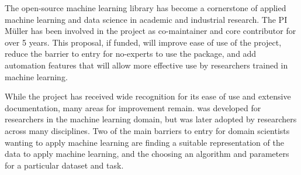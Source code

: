 \vspace{-3mm}
\vspace{-3mm}
The open-source machine learning library \sklearn{} has become a cornerstone of
applied machine learning and data science in academic and industrial research.
The PI M\"uller has been involved in the \sklearn{} project as co-maintainer
and core contributor for over 5 years. This proposal, if funded, will improve
ease of use of the \sklearn{} project, reduce the barrier to entry for
no-experts to use the package, and add automation features that will allow more
effective use by researchers trained in machine learning.

While the \sklearn{} project has received wide recognition for its ease of
use and extensive documentation, many areas for improvement remain.
\sklearn{} was developed for researchers in the machine learning domain,
but was later adopted by researchers across many disciplines.
Two of the main barriers to entry for domain scientists wanting to apply
machine learning are finding a suitable representation of the data to apply
machine learning, and the choosing an algorithm and parameters for a particular
dataset and task.

